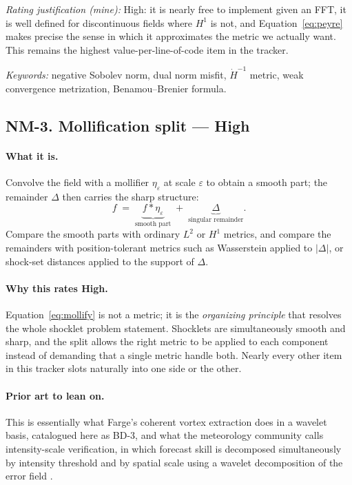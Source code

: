 \documentclass[11pt]{article}
\newcommand{\High}{\textbf{High}}
\newcommand{\keywords}[1]{\par\smallskip\noindent\textit{Keywords:} #1}
\newcommand{\rating}[1]{\par\smallskip\noindent\textit{Rating justification (mine):} #1}
\begin{document}
\rating{High: it is nearly free to implement given an FFT, it is well defined for
discontinuous fields where $H^1$ is not, and Equation~\eqref{eq:peyre} makes precise the
sense in which it approximates the metric we actually want. This remains the highest
value-per-line-of-code item in the tracker.}

\keywords{negative Sobolev norm, dual norm misfit, $\dot H^{-1}$ metric, weak convergence
metrization, Benamou--Brenier formula.}

\subsection{NM-3. Mollification split --- \High{}}

\paragraph{What it is.} Convolve the field with a mollifier $\eta_\varepsilon$ at scale
$\varepsilon$ to obtain a smooth part; the remainder $\Delta$ then carries the sharp
structure:
\begin{equation}
f \;=\; \underbrace{f * \eta_\varepsilon}_{\text{smooth part}} \;+\;
\underbrace{\Delta}_{\text{singular remainder}} .
\label{eq:mollify}
\end{equation}
Compare the smooth parts with ordinary $L^2$ or $H^1$ metrics, and compare the remainders
with position-tolerant metrics such as Wasserstein applied to $|\Delta|$, or shock-set
distances applied to the support of $\Delta$.

\paragraph{Why this rates High.} Equation~\eqref{eq:mollify} is not a metric; it is the
\emph{organizing principle} that resolves the whole shocklet problem statement. Shocklets
are simultaneously smooth and sharp, and the split allows the right metric to be applied to
each component instead of demanding that a single metric handle both. Nearly every other
item in this tracker slots naturally into one side or the other.

\paragraph{Prior art to lean on.} This is essentially what Farge's coherent vortex
extraction does in a wavelet basis, catalogued here as BD-3, and what the meteorology
community calls intensity-scale verification, in which forecast skill is decomposed
simultaneously by intensity threshold and by spatial scale using a wavelet decomposition of
the error field \cite{casati2004}.
\end{document}
